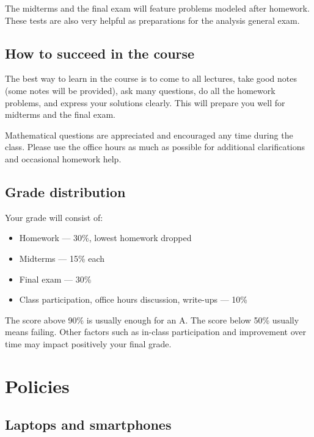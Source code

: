 \documentclass[oneside,11pt]{amsart}
\begin{document}
The midterms and the final exam will feature
problems modeled after homework.
These tests are also very helpful as preparations 
for the analysis general exam.

\subsection{How to succeed in the course}

The best way to learn in the course is to come to all lectures, take good notes
(some notes will be provided),
ask many questions,
do all the homework problems, and express your solutions
clearly.
This will prepare you well for midterms and the final exam.

Mathematical questions are appreciated and encouraged any time during the
class. Please use the office hours as much as possible for additional
clarifications and occasional homework help.

\subsection{Grade distribution}

Your grade will consist of:
\begin{itemize}
	\item Homework --- 30\%, lowest homework dropped
	\item Midterms --- 15\% each
	\item Final exam --- 30\%
	\item Class participation, office hours discussion, write-ups --- 10\%
\end{itemize}
The score above 90\% is usually enough for an A.
The score below 50\% usually means failing.
Other factors such as in-class participation
and improvement over time may impact positively your final grade.













\section{Policies}

\subsection{Laptops and smartphones}
\end{document}
